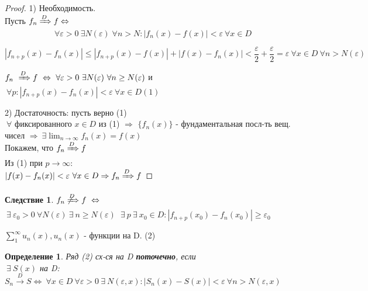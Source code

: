 \documentclass[a4paper, 12pt]{article}
\newtheorem{Definition}{Определение}
\newtheorem{Consequence}{Следствие}
\begin{document}
    \begin{proof}
        1) Необходимость.\\
        Пусть $f_n \xRightarrow{D} f \Leftrightarrow$
        \[\ \forall \varepsilon > 0 \ \exists N(\varepsilon) \; \forall n > N:
        \left| f_n(x) - f(x)\right| < \varepsilon \ \forall x \in D\]

        \[\left| f_{n + p}(x) - f_n(x)\right| \le
        \left| f_{n + p}(x) - f(x)\right| + \left| f(x) - f_n(x)\right|
        < \dfrac{\varepsilon}{2} + \dfrac{\varepsilon}{2} = \varepsilon
        \ \forall x \in D \ \forall n > N(\varepsilon)\]

        $f_n \ \xRightarrow{D} f \ \Leftrightarrow \ \forall \varepsilon > 0
        \ \exists N(\varepsilon) \ \forall n \ge N(\varepsilon)$ и $\ \forall
        p: \left| f_{n + p}(x) - f_n(x) \right| < \varepsilon \ \forall x
        \in D (1)$

        \newpage

        2) Достаточность: пусть верно (1) \\
        $\ \forall$ фиксированного $x \in D$ из (1) $\Rightarrow$ $\{f_n(x)\}$
        - фундаментальная посл-ть вещ. чисел $\Rightarrow \ \exists
        \displaystyle \lim^{}_{n \rightarrow \infty} f_n(x) = f(x)$ \\
        Покажем, что $f_n \xRightarrow{D} f$ \\
        Из (1) при $p \rightarrow \infty:$ \\
        $\left| f(x) - f_n(x) \right| < \varepsilon \ \forall x \in D
        \Rightarrow f_n \xRightarrow{D} f$
    \end{proof}

    \begin{Consequence}
        $f_n \not \xRightarrow{D} f \ \Leftrightarrow$\\
        $\ \exists \ \varepsilon_0
        > 0 \ \forall N(\varepsilon) \ \exists \  n \ge N(\varepsilon)$
        $\ \exists \  p \ \exists \  x_0 \in D:
        \left| f_{n + p}(x_0) - f_n(x_0)\right| \ge \varepsilon_0$
    \end{Consequence}

    \vspace{1cm}
    $\displaystyle \sum ^{\infty}_{1} u_n(x), u_n(x)$ - функции на D. (2)

    \begin{Definition}
        Ряд (2) сх-ся на D \textbf{поточечно}, если \\
         $\ \exists \  S(x)$ на D: $S_n \xrightarrow{D} S \Leftrightarrow
         \ \forall x \in D \ \forall \varepsilon > 0 \ \exists
         \ N(\varepsilon, x): \left| S_n(x) - S(x) \right| < \varepsilon
         \ \forall n > N(\varepsilon, x)$
    \end{Definition}
\end{document}
